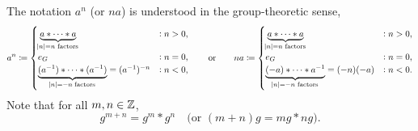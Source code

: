 \documentclass[11pt,openany]{article}
\begin{document}
\begin{remark*}
	The notation \(a^n\) (or $na$) is understood in the group-theoretic sense, \[
	a^n \coloneqq
	\begin{cases}
		\underbrace{a \ast \cdots \ast a}_{\abs{n}=n \text{ factors}} &: n > 0, \\
		e_G &: n = 0, \\
		\underbrace{(a^{-1})\ast\cdots\ast (a^{-1})}_{\abs{n}=-n\; \text{factors}}=(a^{-1})^{-n}&: n < 0,
	\end{cases}\quad\quad\text{or}\quad\quad	
na \coloneqq
\begin{cases}
\underbrace{a \ast \cdots \ast a}_{\abs{n}=n \text{ factors}} &: n > 0, \\
e_G &: n = 0, \\
\underbrace{(-a)\ast\cdots\ast a^{-1}}_{\abs{n}=-n \text{ factors}}=(-n)(-a)&: n < 0.
\end{cases}
\] Note that for all $m,n\in\mathbb{Z}$, \[
g^{m+n}=g^m\ast g^n\quad\text{(or $(m+n)g=mg\ast ng$)}.
\]

\end{remark*}
\end{document}
